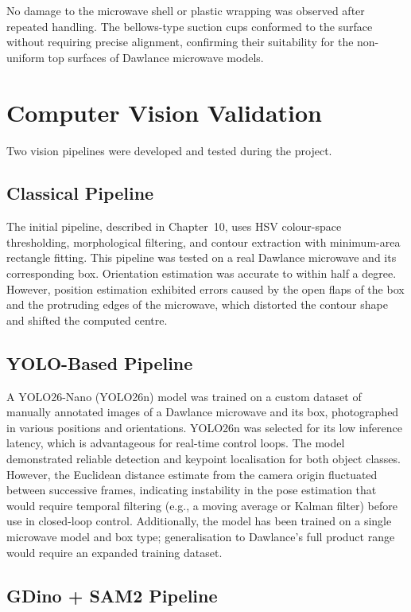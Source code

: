 No damage to the microwave shell or plastic wrapping was observed after repeated handling. The bellows-type suction cups conformed to the surface without requiring precise alignment, confirming their suitability for the non-uniform top surfaces of Dawlance microwave models.


\section{Computer Vision Validation}

Two vision pipelines were developed and tested during the project.

\subsection{Classical Pipeline}

The initial pipeline, described in Chapter~10, uses HSV colour-space thresholding, morphological filtering, and contour extraction with minimum-area rectangle fitting. This pipeline was tested on a real Dawlance microwave and its corresponding box. Orientation estimation was accurate to within half a degree. However, position estimation exhibited errors caused by the open flaps of the box and the protruding edges of the microwave, which distorted the contour shape and shifted the computed centre.

\subsection{YOLO-Based Pipeline}

A YOLO26-Nano (YOLO26n) model was trained on a custom dataset of manually annotated images of a Dawlance microwave and its box, photographed in various positions and orientations. YOLO26n was selected for its low inference latency, which is advantageous for real-time control loops. The model demonstrated reliable detection and keypoint localisation for both object classes. However, the Euclidean distance estimate from the camera origin fluctuated between successive frames, indicating instability in the pose estimation that would require temporal filtering (e.g., a moving average or Kalman filter) before use in closed-loop control. Additionally, the model has been trained on a single microwave model and box type; generalisation to Dawlance's full product range would require an expanded training dataset.

\subsection{GDino + SAM2 Pipeline}


